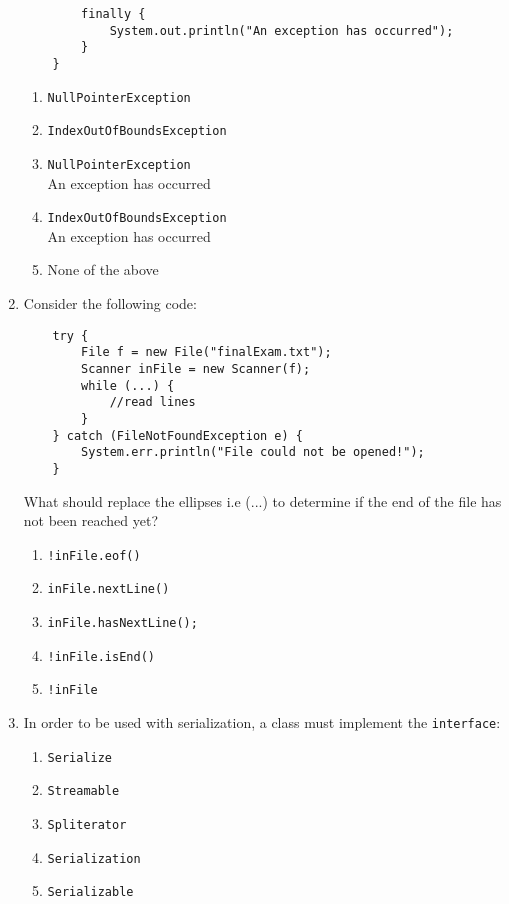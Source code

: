 \documentclass[S17-Final.tex]{subfiles}
\begin{document}
\begin{enumerate}
\begin{lstlisting}
        finally {
            System.out.println("An exception has occurred");
        }
    }
\end{lstlisting}
	
\begin{enumerate}
\item  \texttt{NullPointerException}
\item  \texttt{IndexOutOfBoundsException}
\item  \texttt{NullPointerException}\\An exception has occurred \ifdraft \Ans \fi 
\item  \texttt{IndexOutOfBoundsException}\\An exception has occurred
\item  None of the above
\end{enumerate}

\item Consider the following code:
\begin{lstlisting}
    try {
        File f = new File("finalExam.txt");
        Scanner inFile = new Scanner(f);
        while (...) {
            //read lines
        }
    } catch (FileNotFoundException e) {
        System.err.println("File could not be opened!");
    }
\end{lstlisting}

What should replace the ellipses i.e (...) to determine if the end of the file has not been reached yet?
	
\begin{enumerate}
\item  \texttt{!inFile.eof()}
\item  \texttt{inFile.nextLine()}
\item  \texttt{inFile.hasNextLine();} \ifdraft \Ans \fi 
\item  \texttt{!inFile.isEnd()}
\item  \texttt{!inFile}
\end{enumerate}

\item In order to be used with serialization, a class must implement the \texttt{interface}:

\begin{enumerate}
\item  \texttt{Serialize}
\item  \texttt{Streamable}
\item  \texttt{Spliterator}
\item  \texttt{Serialization}
\item  \texttt{Serializable} \ifdraft \Ans \fi 
\end{enumerate}


\end{enumerate}
\end{document}
